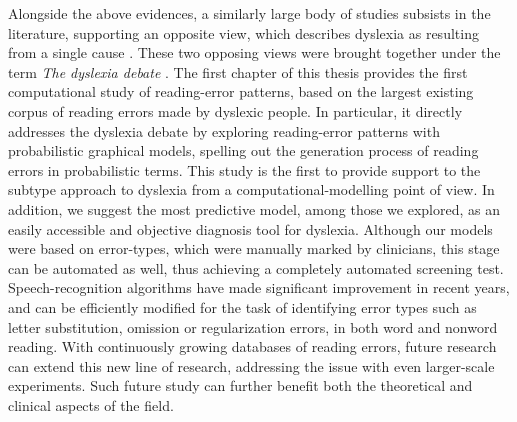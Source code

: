Alongside the above evidences, a similarly large body of studies subsists in the literature, supporting an opposite view, which describes dyslexia as resulting from a single cause \citep{stanovich1988explaining, s98, s00, ss05, rrddcw03, rs08, d09, bdvsgmg13, vgpsh13, grggvfb02, r14}. These two opposing views were brought together under the term \textit{The dyslexia debate} \citep{eg14}. The first chapter of this thesis provides the first computational study of reading-error patterns, based on the largest existing corpus of reading errors made by dyslexic people. In particular, it directly addresses the dyslexia debate by exploring reading-error patterns with probabilistic graphical models, spelling out the generation process of reading errors in probabilistic terms. This study is the first to provide support to the subtype approach to dyslexia from a computational-modelling point of view. In addition, we suggest the most predictive model, among those we explored, as an easily accessible and objective diagnosis tool for dyslexia. Although our models were based on error-types, which were manually marked by clinicians, this stage can be automated as well, thus achieving a completely automated screening test. Speech-recognition algorithms have made significant improvement in recent years, and can be efficiently modified for the task of identifying error types such as letter substitution, omission or regularization errors, in both word and nonword reading. With continuously growing databases of reading errors, future research can extend this new line of research, addressing the issue with even larger-scale experiments. Such future study can further benefit both the theoretical and clinical aspects of the field. 

